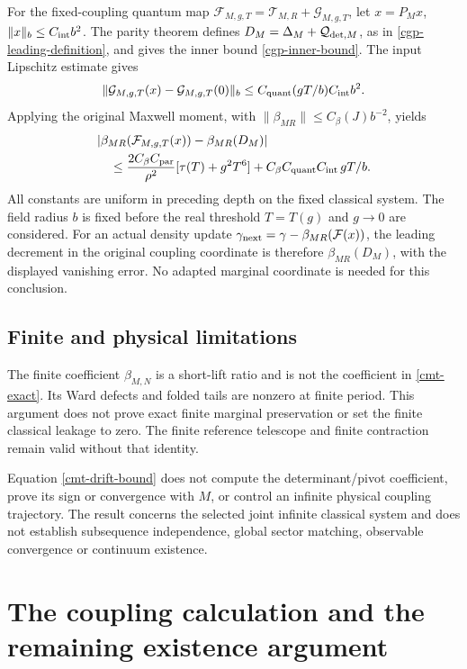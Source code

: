 \documentclass[11pt]{article}
\theoremstyle{remark}
\begin{document}
For the fixed-coupling quantum map
\(\mathcal F_{M,g,T}=\mathcal T_{M,R}+\mathcal G_{M,g,T}\),
let \(x=P_Mx\), \(\|x\|_b\le C_{\rm int}b^2\). The parity
theorem defines
\(D_M=\Delta_M+\mathcal Q_{{\rm det},M}\), as in
\eqref{cgp-leading-definition}, and gives the inner bound
\eqref{cgp-inner-bound}. The input Lipschitz estimate gives
\[
 \|\mathcal G_{M,g,T}(x)-\mathcal G_{M,g,T}(0)\|_b
      \le C_{\rm quant}(gT/b)C_{\rm int}b^2.
\]
Applying the original Maxwell moment, with
\(\|\beta_{MR}\|\le C_\beta(J)b^{-2}\), yields
\begin{align}
 &|\beta_{MR}(\mathcal F_{M,g,T}(x))
                         -\beta_{MR}(D_M)|\notag\\
 &\quad\le
   \frac{2C_\beta C_{\rm par}}{\rho^2}
                         [\tau(T)+g^2T^6]
       +C_\beta C_{\rm quant}C_{\rm int}\,gT/b.
 \label{cmt-drift-bound}
\end{align}
All constants are uniform in preceding depth on the fixed
classical system. The field radius \(b\) is fixed before
the real threshold \(T=T(g)\) and \(g\to0\) are considered.
For an actual density update
\(\gamma_{\rm next}=\gamma-\beta_{MR}(\mathcal F(x))\),
the leading decrement in the original coupling coordinate
is therefore \(\beta_{MR}(D_M)\), with the displayed
vanishing error. No adapted marginal coordinate is needed
for this conclusion.

\subsection{Finite and physical limitations}
\label{cmt-scope}

The finite coefficient \(\beta_{M,N}\) is a short-lift
ratio and is not the coefficient in
\eqref{cmt-exact}. Its Ward defects and folded tails
are nonzero at finite period. This argument does not
prove exact finite marginal preservation or set the
finite classical leakage to zero. The finite reference
telescope and finite contraction remain valid without
that identity.

Equation \eqref{cmt-drift-bound} does not compute the
determinant/pivot coefficient, prove its sign or convergence
with \(M\), or control an infinite physical coupling
trajectory. The result concerns the selected joint
infinite classical system and does not establish
subsequence independence, global sector matching,
observable convergence or continuum existence.


\section{The coupling calculation and the remaining existence argument}
\label{fin-next}
\end{document}

